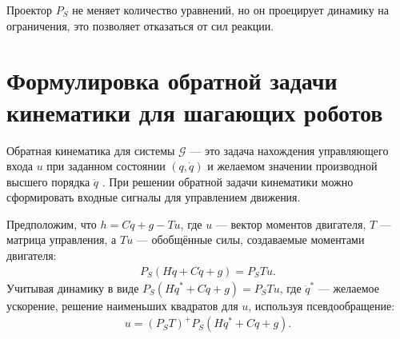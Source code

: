 Проектор ${P}_S$ не меняет количество уравнений, но он проецирует динамику на ограничения, это позволяет отказаться от сил реакции.
%
\section{Формулировка обратной задачи кинематики для шагающих роботов}\label{sec:ch2/sect4}

Обратная кинематика для системы $\mathcal{G}$ --- это задача нахождения управляющего входа ${u}$ при заданном состоянии $({q}, \dot{{q}})$ и желаемом значении производной высшего порядка $\ddot{{q}}$ \cite{Righetti2011}. При решении обратной задачи кинематики можно сформировать входные сигналы для управлением движения.
\begin{comment}
Динамика свободно плавающего робота с жёстким телом, подверженного внешним ограничениям, в общем случае задаётся следующим образом
\begin{equation}
	M \ddot{q} +h =S\T\tau + J_c\T \lambda,
\end{equation}
при $k$ ограничениях
\begin{equation}
	J_c \ddot{q} = b(q,\dot{q}),
\end{equation}
где $M \in \mathbb{R}^{n+6 \times n+6}$ - матрица инерции динамики жёсткого тела, $h \in \mathbb{R}^{n+6}$ - обобщённый вектор силы, содержащий эффекты Кориолиса, центробежные и гравитационные эффекты, $\tau \in \mathbb{R}^{n}$ - вектор воздействия и $S \in \mathbb{R}^{n \times n+6}$ - матрица выбора соединений, отражающая недостаточность действия - например, для большинства роботов с плавающей базой S будет матрицей тождества в первой подматрице $n \times n$, а в остальных местах - нули. 
$J_c \in \mathbb{R}^{k \times n+6}$ - Якобиан $k$ ограничений c $\lambda \in \mathbb{R}^{k}$ множителями Лагранжа, соответствующих ограничивающим силам.
\end{comment}
Предположим, что ${h} = {C}\dot{{q}} + {g} - {T}{u}$, где ${u}$ --- вектор моментов двигателя, ${T}$ --- матрица управления, а ${T}{u}$ --- обобщённые силы, создаваемые моментами двигателя:
%
\begin{align}
	{P}_S({H}\ddot{{q}} + {C}\dot{{q}}+ {g}) = {P}_S{T}{u}.
\end{align}
%
Учитывая динамику в виде ${P}_S({H}\ddot{{q}}^* + {C}\dot{{q}}+ {g}) = {P}_S{T}{u}$, где $\ddot{{q}}^*$ --- желаемое ускорение, решение наименьших квадратов для ${u}$, используя псевдообращение:
%
\begin{align}
	{u}
	=
	({P}_S{T})^+{P}_S({H}\ddot{{q}}^* + {C}\dot{{q}}+ {g}).
\end{align}
